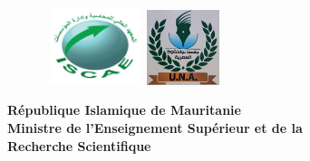 \documentclass[a4paper, 12pt]{report}
\begin{document}
 
	\begin{titlepage}
		\begin{figure}[htbp]
			\hbox{
				\hspace*{-1.4cm}
				\includegraphics[width=100px]{./Template LaTeX/Images/ISCAE.jpg}
				\hspace*{11cm}
				\includegraphics[width=80px]{./Template LaTeX/Images/logoUniv.jpg}
			}
		\end{figure}
		\vspace {-4cm}
		
		\begin{center}
			\vspace{1cm}
			
			{\bf République Islamique de Mauritanie } \vspace{-0.2cm}\\
			{\bf	Ministre de l’Enseignement Supérieur et de la } \vspace{-0.2cm}\\
			
			{\bf Recherche Scientifique }\\
			
			\vspace{2cm}
			

\end{center}
\end{titlepage}
\end{document}
